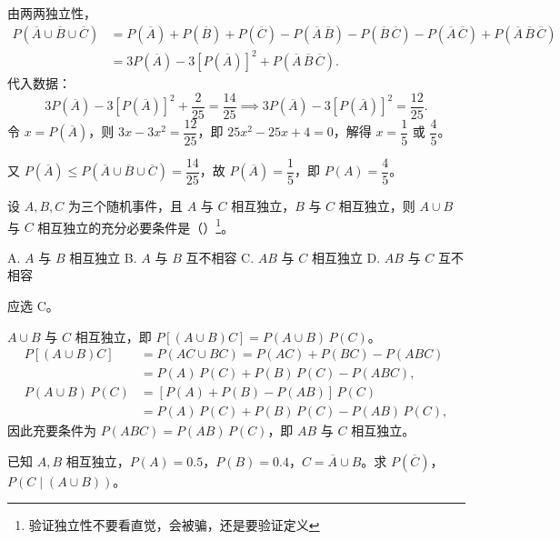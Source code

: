 ﻿\documentclass[lang=cn,11pt]{elegantbook}
\begin{document}
\begin{solution}
由两两独立性，
\[
\begin{aligned}
P(\overline{A} \cup \overline{B} \cup \overline{C}) &= P(\overline{A})+P(\overline{B})+P(\overline{C}) - P(\overline{A}\,\overline{B}) - P(\overline{B}\,\overline{C}) - P(\overline{A}\,\overline{C}) + P(\overline{A}\,\overline{B}\,\overline{C}) \\
&= 3P(\overline{A}) - 3[P(\overline{A})]^2 + P(\overline{A}\,\overline{B}\,\overline{C}).
\end{aligned}
\]
代入数据：
\[
3P(\overline{A}) - 3[P(\overline{A})]^2 + \frac{2}{25} = \frac{14}{25} \implies 3P(\overline{A}) - 3[P(\overline{A})]^2 = \frac{12}{25}.
\]
令 \(x = P(\overline{A})\)，则 \(3x - 3x^2 = \dfrac{12}{25}\)，即 \(25x^2 - 25x + 4 = 0\)，解得 \(x = \dfrac{1}{5}\) 或 \(\dfrac{4}{5}\)。

又 \(P(\overline{A}) \le P(\overline{A} \cup \overline{B} \cup \overline{C}) = \dfrac{14}{25}\)，故 \(P(\overline{A}) = \dfrac{1}{5}\)，即 \(P(A) = \dfrac{4}{5}\)。
\end{solution}

\begin{exercise}\label{exer:1-43}
设 \(A,B,C\) 为三个随机事件，且 \(A\) 与 \(C\) 相互独立，\(B\) 与 \(C\) 相互独立，则 \(A\cup B\) 与 \(C\) 相互独立的充分必要条件是（\quad）\footnote{验证独立性不要看直觉，会被骗，还是要验证定义}。\par
A. \(A\) 与 \(B\) 相互独立\quad
B. \(A\) 与 \(B\) 互不相容\quad
C. \(AB\) 与 \(C\) 相互独立\quad
D. \(AB\) 与 \(C\) 互不相容
\end{exercise}

\begin{solution}
应选 C。

\(A\cup B\) 与 \(C\) 相互独立，即 \(P[(A\cup B)C] = P(A\cup B)\,P(C)\)。
\[
\begin{aligned}
P[(A\cup B)C] &= P(AC\cup BC) = P(AC)+P(BC)-P(ABC) \\
&= P(A)\,P(C)+P(B)\,P(C)-P(ABC), \\
P(A\cup B)\,P(C) &= [P(A)+P(B)-P(AB)]\,P(C) \\
&= P(A)\,P(C)+P(B)\,P(C)-P(AB)\,P(C),
\end{aligned}
\]
因此充要条件为 \(P(ABC)=P(AB)\,P(C)\)，即 \(AB\) 与 \(C\) 相互独立。
\end{solution}

\begin{exercise}\label{exer:1-56}
已知 \(A,B\) 相互独立，\(P(A)=0.5\)，\(P(B)=0.4\)，\(C=\overline{A}\cup B\)。求 \(P(\overline{C})\)，\(P(C\mid(A\cup B))\)。
\end{exercise}
\end{document}
